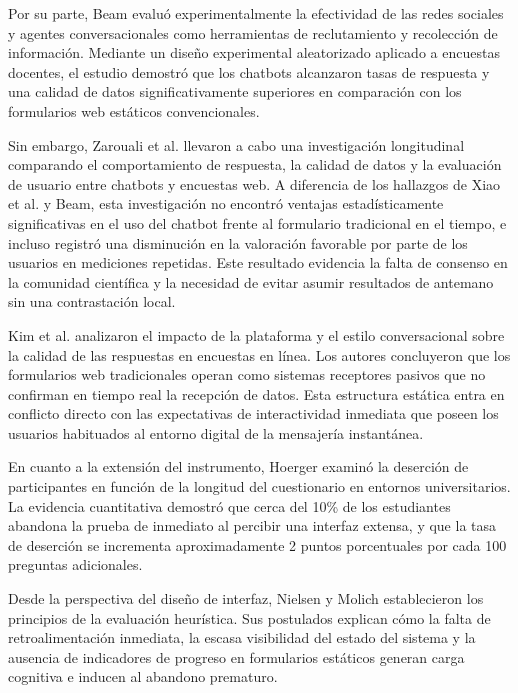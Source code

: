 \documentclass[12pt,letterpaper]{article}
\begin{document}
Por su parte, Beam \cite{beam2023} evaluó experimentalmente la efectividad de las redes sociales y agentes conversacionales como herramientas de reclutamiento y recolección de información. Mediante un diseño experimental aleatorizado aplicado a encuestas docentes, el estudio demostró que los chatbots alcanzaron tasas de respuesta y una calidad de datos significativamente superiores en comparación con los formularios web estáticos convencionales.

Sin embargo, Zarouali et al. \cite{zarouali2023} llevaron a cabo una investigación longitudinal comparando el comportamiento de respuesta, la calidad de datos y la evaluación de usuario entre chatbots y encuestas web. A diferencia de los hallazgos de Xiao et al. y Beam, esta investigación no encontró ventajas estadísticamente significativas en el uso del chatbot frente al formulario tradicional en el tiempo, e incluso registró una disminución en la valoración favorable por parte de los usuarios en mediciones repetidas. Este resultado evidencia la falta de consenso en la comunidad científica y la necesidad de evitar asumir resultados de antemano sin una contrastación local.

Kim et al. \cite{kim2019} analizaron el impacto de la plataforma y el estilo conversacional sobre la calidad de las respuestas en encuestas en línea. Los autores concluyeron que los formularios web tradicionales operan como sistemas receptores pasivos que no confirman en tiempo real la recepción de datos. Esta estructura estática entra en conflicto directo con las expectativas de interactividad inmediata que poseen los usuarios habituados al entorno digital de la mensajería instantánea.

En cuanto a la extensión del instrumento, Hoerger \cite{hoerger2010} examinó la deserción de participantes en función de la longitud del cuestionario en entornos universitarios. La evidencia cuantitativa demostró que cerca del 10\% de los estudiantes abandona la prueba de inmediato al percibir una interfaz extensa, y que la tasa de deserción se incrementa aproximadamente 2 puntos porcentuales por cada 100 preguntas adicionales.

Desde la perspectiva del diseño de interfaz, Nielsen y Molich \cite{nielsen1990} establecieron los principios de la evaluación heurística. Sus postulados explican cómo la falta de retroalimentación inmediata, la escasa visibilidad del estado del sistema y la ausencia de indicadores de progreso en formularios estáticos generan carga cognitiva e inducen al abandono prematuro.
\end{document}
